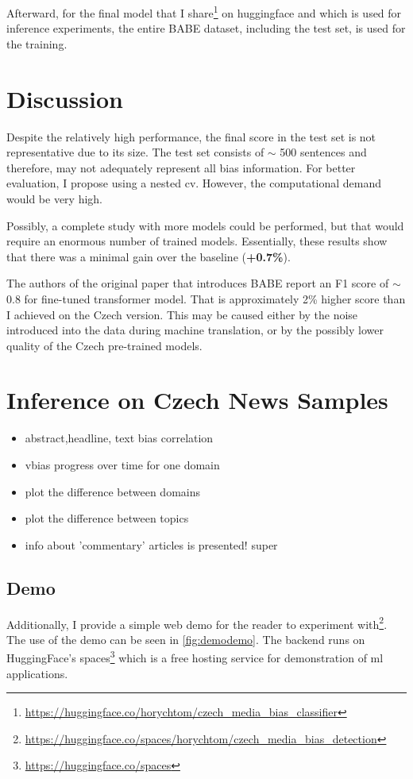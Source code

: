 Afterward, for the final model that I share\footnote{\url{https://huggingface.co/horychtom/czech_media_bias_classifier}} on huggingface and which is used for inference experiments, the entire BABE dataset, including the test set, is used for the training.

\section{Discussion}
Despite the relatively high performance, the final score in the test set is not representative due to its size. The test set consists of $\sim$ 500 sentences and therefore, may not adequately represent all bias information. For better evaluation, I propose using a nested \gls{cv}. However, the computational demand would be very high. 

Possibly, a complete study with more models could be performed, but that would require an enormous number of trained models. Essentially, these results show that there was a minimal gain over the baseline (\textbf{+0.7\%}).

The authors of the original paper that introduces BABE \cite{spinde2021neural} report an F1 score of $\sim$ 0.8 for fine-tuned transformer model. That is approximately 2\% higher score than I achieved on the Czech version. This may be caused either by the noise introduced into the data during machine translation, or by the possibly lower quality of the Czech pre-trained models.





\newpage

\section{Inference on Czech News Samples}\label{inference}

\begin{itemize}
    \item abstract,headline, text bias correlation
    \item vbias progress over time for one domain
    \item plot the difference between domains
    \item plot the difference between topics
    \item info about 'commentary' articles is presented! super
\end{itemize}

\subsection{Demo}
Additionally, I provide a simple web demo for the reader to experiment with\footnote{\url{https://huggingface.co/spaces/horychtom/czech_media_bias_detection}}. The use of the demo can be seen in \ref{fig:demodemo}. The backend runs on HuggingFace's spaces\footnote{\url{https://huggingface.co/spaces}} which is a free hosting service for demonstration of \gls{ml} applications. 

